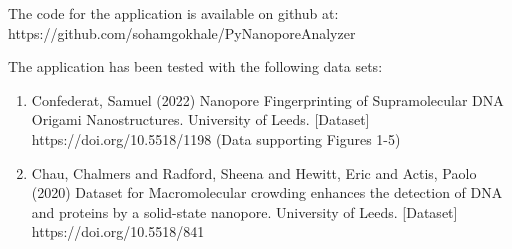 \documentclass[journal]{IEEEtran}
\begin{document}
\appendix
\noindent The code for the application is available on github at: https://github.com/sohamgokhale/PyNanoporeAnalyzer

\noindent The application has been tested with the following data sets:
\begin{enumerate}
  \item Confederat, Samuel (2022) Nanopore Fingerprinting of Supramolecular DNA Origami Nanostructures. University of Leeds. [Dataset] https://doi.org/10.5518/1198 (Data supporting Figures 1-5)
  \item Chau, Chalmers and Radford, Sheena and Hewitt, Eric and Actis, Paolo (2020) Dataset for Macromolecular crowding enhances the detection of DNA and proteins by a solid-state nanopore. University of Leeds. [Dataset] https://doi.org/10.5518/841
\end{enumerate}






\end{document}
